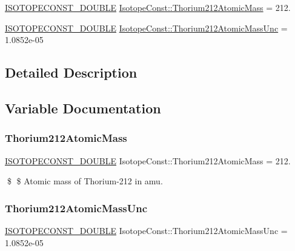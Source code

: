 \begin{DoxyCompactItemize}
\item 
\mbox{\hyperlink{group___isotope_const-_macros_ga8f45a7272ce02c0b4c65c44636ed719a}{I\+S\+O\+T\+O\+P\+E\+C\+O\+N\+S\+T\+\_\+\+D\+O\+U\+B\+LE}} \mbox{\hyperlink{group___isotope_const-_thorium-_th212_ga443440752c7411c37cb99deb0229e593}{Isotope\+Const\+::\+Thorium212\+Atomic\+Mass}} = 212.
\item 
\mbox{\hyperlink{group___isotope_const-_macros_ga8f45a7272ce02c0b4c65c44636ed719a}{I\+S\+O\+T\+O\+P\+E\+C\+O\+N\+S\+T\+\_\+\+D\+O\+U\+B\+LE}} \mbox{\hyperlink{group___isotope_const-_thorium-_th212_gaa8b72597df859c8df1400772d42b8a6c}{Isotope\+Const\+::\+Thorium212\+Atomic\+Mass\+Unc}} = 1.\+0852e-\/05
\end{DoxyCompactItemize}


\subsection{Detailed Description}


\subsection{Variable Documentation}
\mbox{\label{group___isotope_const-_thorium-_th212_ga443440752c7411c37cb99deb0229e593}} 
\subsubsection{\texorpdfstring{Thorium212\+Atomic\+Mass}{Thorium212AtomicMass}}
{\footnotesize\ttfamily \mbox{\hyperlink{group___isotope_const-_macros_ga8f45a7272ce02c0b4c65c44636ed719a}{I\+S\+O\+T\+O\+P\+E\+C\+O\+N\+S\+T\+\_\+\+D\+O\+U\+B\+LE}} Isotope\+Const\+::\+Thorium212\+Atomic\+Mass = 212.}

\$ \$ Atomic mass of Thorium-\/212 in amu. \mbox{\label{group___isotope_const-_thorium-_th212_gaa8b72597df859c8df1400772d42b8a6c}} 
\subsubsection{\texorpdfstring{Thorium212\+Atomic\+Mass\+Unc}{Thorium212AtomicMassUnc}}
{\footnotesize\ttfamily \mbox{\hyperlink{group___isotope_const-_macros_ga8f45a7272ce02c0b4c65c44636ed719a}{I\+S\+O\+T\+O\+P\+E\+C\+O\+N\+S\+T\+\_\+\+D\+O\+U\+B\+LE}} Isotope\+Const\+::\+Thorium212\+Atomic\+Mass\+Unc = 1.\+0852e-\/05}

